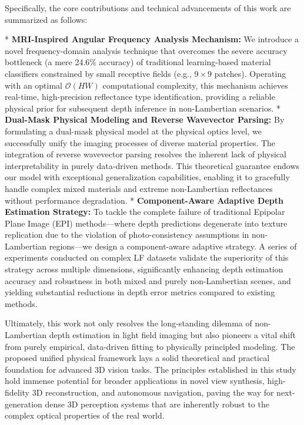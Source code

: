 \documentclass[journal]{IEEEtran}
\begin{document}
Specifically, the core contributions and technical advancements of this work are summarized as follows:

*   \textbf{MRI-Inspired Angular Frequency Analysis Mechanism:} We introduce a novel frequency-domain analysis technique that overcomes the severe accuracy bottleneck (a mere 24.6\% accuracy) of traditional learning-based material classifiers constrained by small receptive fields (e.g., \(9 \times 9\) patches). Operating with an optimal \(\mathcal{O}(HW)\) computational complexity, this mechanism achieves real-time, high-precision reflectance type identification, providing a reliable physical prior for subsequent depth inference in non-Lambertian scenarios.
*   \textbf{Dual-Mask Physical Modeling and Reverse Wavevector Parsing:} By formulating a dual-mask physical model at the physical optics level, we successfully unify the imaging processes of diverse material properties. The integration of reverse wavevector parsing resolves the inherent lack of physical interpretability in purely data-driven methods. This theoretical guarantee endows our model with exceptional generalization capabilities, enabling it to gracefully handle complex mixed materials and extreme non-Lambertian reflectances without performance degradation.
*   \textbf{Component-Aware Adaptive Depth Estimation Strategy:} To tackle the complete failure of traditional Epipolar Plane Image (EPI) methods—where depth predictions degenerate into texture replication due to the violation of photo-consistency assumptions in non-Lambertian regions—we design a component-aware adaptive strategy. A series of experiments conducted on complex LF datasets validate the superiority of this strategy across multiple dimensions, significantly enhancing depth estimation accuracy and robustness in both mixed and purely non-Lambertian scenes, and yielding substantial reductions in depth error metrics compared to existing methods.

Ultimately, this work not only resolves the long-standing dilemma of non-Lambertian depth estimation in light field imaging but also pioneers a vital shift from purely empirical, data-driven fitting to physically principled modeling. The proposed unified physical framework lays a solid theoretical and practical foundation for advanced 3D vision tasks. The principles established in this study hold immense potential for broader applications in novel view synthesis, high-fidelity 3D reconstruction, and autonomous navigation, paving the way for next-generation dense 3D perception systems that are inherently robust to the complex optical properties of the real world.
\end{document}
